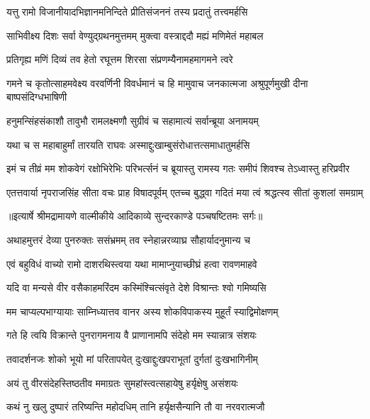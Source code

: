 \twolineshloka
{यत्तु रामो विजानीयादभिज्ञानमनिन्दिते}
{प्रीतिसंजननं तस्य प्रदातुं तत्त्वमर्हसि} %

\twolineshloka
{साभिवीक्ष्य दिशः सर्वा वेण्युद्ग्रथनमुत्तमम्}
{मुक्त्वा वस्त्राद्ददौ मह्यं मणिमेतं महाबल} %

\twolineshloka
{प्रतिगृह्य मणिं दिव्यं तव हेतो रघूत्तम}
{शिरसा संप्रणम्यैनामहमागमने त्वरे} %

\threelineshloka
{गमने च कृतोत्साहमवेक्ष्य वरवर्णिनी}
{विवर्धमानं च हि मामुवाच जनकात्मजा}
{अश्रुपूर्णमुखी दीना बाष्पसंदिग्धभाषिणी} %

\twolineshloka
{हनुमन्सिंहसंकाशौ तावुभौ रामलक्ष्मणौ}
{सुग्रीवं च सहामात्यं सर्वान्ब्रूया अनामयम्} %

\twolineshloka
{यथा च स महाबाहुर्मां तारयति राघवः}
{अस्माद्दुःखाम्बुसंरोधात्तत्समाधातुमर्हसि} %

\fourlineindentedshloka
{इमं च तीव्रं मम शोकवेगं}
{ रक्षोभिरेभिः परिभर्त्सनं च}
{ब्रूयास्तु रामस्य गतः समीपं}
{ शिवश्च तेऽध्वास्तु हरिप्रवीर} %

\fourlineindentedshloka
{एतत्तवार्या नृपराजसिंह}
{ सीता वचः प्राह विषादपूर्वम्}
{एतच्च बुद्ध्वा गदितं मया त्वं}
{ श्रद्धत्स्व सीतां कुशलां समग्राम्} %


{॥इत्यार्षे श्रीमद्रामायणे वाल्मीकीये आदिकाव्ये सुन्दरकाण्डे पञ्चषष्टितमः सर्गः॥}


\twolineshloka
{अथाहमुत्तरं देव्या पुनरुक्तः ससंभ्रमम्}
{तव स्नेहान्नरव्याघ्र सौहार्यादनुमान्य च} %

\twolineshloka
{एवं बहुविधं वाच्यो रामो दाशरथिस्त्वया}
{यथा मामाप्नुयाच्छीघ्रं हत्वा रावणमाहवे} %

\twolineshloka
{यदि वा मन्यसे वीर वसैकाहमरिंदम}
{कस्मिंश्चित्संवृते देशे विश्रान्तः श्वो गमिष्यसि} %

\twolineshloka
{मम चाप्यल्पभाग्यायाः साम्निध्यात्तव वानर}
{अस्य शोकविपाकस्य मुहूर्तं स्याद्विमोक्षणम्} %

\twolineshloka
{गते हि त्वयि विक्रान्ते पुनरागमनाय वै}
{प्राणानामपि संदेहो मम स्यान्नात्र संशयः} %

\twolineshloka
{तवादर्शनजः शोको भूयो मां परितापयेत्}
{दुःखाद्दुःखपराभूतां दुर्गतां दुःखभागिनीम्} %

\twolineshloka
{अयं तु वीरसंदेहस्तिष्ठतीव ममाग्रतः}
{सुमहांस्त्वत्सहायेषु हर्यृक्षेषु असंशयः} %

\twolineshloka
{कथं नु खलु दुष्पारं तरिष्यन्ति महोदधिम्}
{तानि हर्यृक्षसैन्यानि तौ वा नरवरात्मजौ} %

